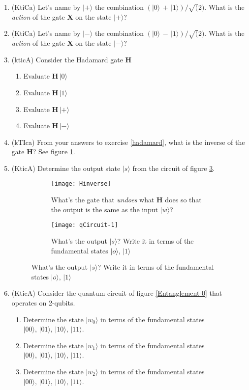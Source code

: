 \documentclass{article}
\begin{document}
\begin{enumerate}
\item (KtiCa) Let's name by $|+\rangle$ the combination $(|0\rangle\,+\,|1\rangle)/\sqrt(2)$. What is the \textit{action} of the gate $\mathbf{X}$ on the state $|+\rangle$?
\item (KtiCa) Let's name by $|-\rangle$ the combination $(|0\rangle\,-\,|1\rangle)/\sqrt(2)$. What is the \textit{action} of the gate $\mathbf{X}$ on the state $|-\rangle$?
\item (kticA) \label{hadamard}Consider the Hadamard gate $\mathbf{H}$
	\begin{enumerate}
	\item Evaluate $\mathbf{H}\,|0\rangle$
	\item Evaluate $\mathbf{H}\,|1\rangle$
	\item Evaluate $\mathbf{H}\,|+\rangle$
	\item Evaluate $\mathbf{H}\,|-\rangle$
	\end{enumerate}
\item (kTIca) From your answers to exercise \ref{hadamard}, what is the inverse of the gate $\mathbf{H}$? See figure \ref{Hinverse}.
\item (KticA) Determine the output state $|s\rangle$ from the circuit of figure \ref{qCircuit-1}.
\begin{figure}[h!]
\centering
	\begin{subfigure}[h]{0.7\textwidth}
	\texttt{[image: Hinverse]}
	\caption{What's the gate that \textit{undoes} what $\mathbf{H}$ does so that the output is the same as the input $|w\rangle$?}
	\label{Hinverse}
	\end{subfigure}
	\begin{subfigure}[h]{0.7\textwidth}
	\texttt{[image: qCircuit-1]}
	\caption{What's the output $|s\rangle$? Write it in terms of the fundamental states $|o\rangle,\,|1\rangle$}
	\label{qCircuit-1}
	\end{subfigure}
\end{figure}
\item (KticA) Consider the quantum circuit of figure \ref{Entanglement-0} that operates on 2-qubits.
	\begin{enumerate}
	\item Determine the state $|w_0\rangle$ in terms of the fundamental states $|00\rangle,\,|01\rangle,\,|10\rangle,\,|11\rangle$. 
	\item Determine the state $|w_1\rangle$ in terms of the fundamental states $|00\rangle,\,|01\rangle,\,|10\rangle,\,|11\rangle$. 
	\item Determine the state $|w_2\rangle$ in terms of the fundamental states $|00\rangle,\,|01\rangle,\,|10\rangle,\,|11\rangle$. 

\end{enumerate}
\end{enumerate}
\end{document}
